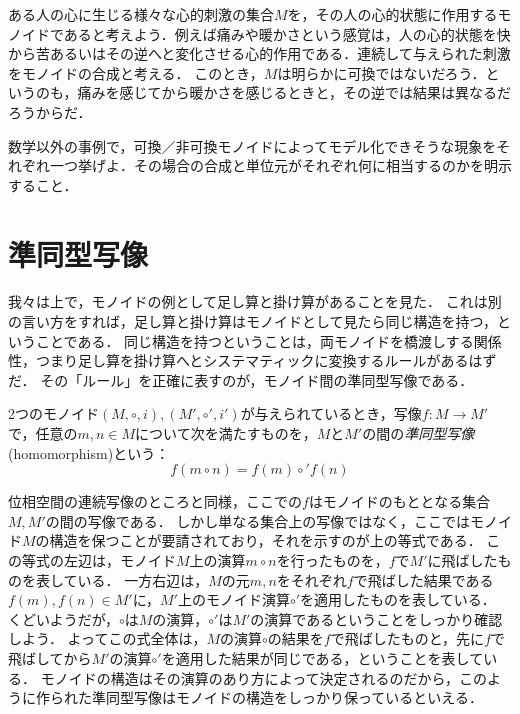 \documentclass[11pt,a4paper]{jsarticle}
\begin{document}
\begin{example}
    ある人の心に生じる様々な心的刺激の集合$M$を，その人の心的状態に作用するモノイドであると考えよう．例えば痛みや暖かさという感覚は，人の心的状態を快から苦あるいはその逆へと変化させる心的作用である．連続して与えられた刺激をモノイドの合成と考える．
    このとき，$M$は明らかに可換ではないだろう．というのも，痛みを感じてから暖かさを感じるときと，その逆では結果は異なるだろうからだ．
\end{example}

\begin{exercise}
    数学以外の事例で，可換／非可換モノイドによってモデル化できそうな現象をそれぞれ一つ挙げよ．その場合の合成と単位元がそれぞれ何に相当するのかを明示すること．
\end{exercise}    


\section{準同型写像}
我々は上で，モノイドの例として足し算と掛け算があることを見た．
これは別の言い方をすれば，足し算と掛け算はモノイドとして見たら同じ構造を持つ，ということである．
同じ構造を持つということは，両モノイドを橋渡しする関係性，つまり足し算を掛け算へとシステマティックに変換するルールがあるはずだ．
その「ルール」を正確に表すのが，モノイド間の準同型写像である．

\begin{dfn}[準同型]
    2つのモノイド$(M, \circ, i), (M', \circ', i')$が与えられているとき，写像$f:M \to M'$で，任意の$m,n \in M$について次を満たすものを，$M$と$M'$の間の\emph{準同型写像}(homomorphism)という：
    \[f(m \circ n) = f(m) \circ' f(n)\]
\end{dfn}

位相空間の連続写像のところと同様，ここでの$f$はモノイドのもととなる集合$M,M'$の間の写像である．
しかし単なる集合上の写像ではなく，ここではモノイド$M$の構造を保つことが要請されており，それを示すのが上の等式である．
この等式の左辺は，モノイド$M$上の演算$m \circ n$を行ったものを，$f$で$M'$に飛ばしたものを表している．
一方右辺は，$M$の元$m,n$をそれぞれ$f$で飛ばした結果である$f(m), f(n) \in M'$に，$M'$上のモノイド演算$\circ'$を適用したものを表している．
くどいようだが，$\circ$は$M$の演算，$\circ'$は$M'$の演算であるということをしっかり確認しよう．
よってこの式全体は，$M$の演算$\circ$の結果を$f$で飛ばしたものと，先に$f$で飛ばしてから$M'$の演算$\circ'$を適用した結果が同じである，ということを表している．
モノイドの構造はその演算のあり方によって決定されるのだから，このように作られた準同型写像はモノイドの構造をしっかり保っているといえる．
\end{document}
